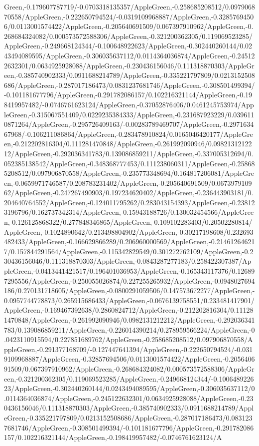 {\begin{tikzternal}
{Green,-0.179607787719/-0.0703318135357/AppleGreen,-0.258685208512/0.097906870558/AppleGreen,-0.222650794524/-0.0319109968887/AppleGreen,-0.32857694506/0.0113001574422/AppleGreen,-0.205640691509/0.067397910962/AppleGreen,-0.268684324082/0.000573572588306/AppleGreen,-0.321200362305/0.119069523285/AppleGreen,-0.249668124344/-0.100648922623/AppleGreen,-0.302440260144/0.0243494089595/AppleGreen,-0.306035637112/0.0114364036874/AppleGreen,-0.245122632301/0.0634925928088/AppleGreen,-0.230436156046/0.111318870303/AppleGreen,-0.385740902333/0.0911688214789/AppleGreen,-0.335221797809/0.0213152508686/AppleGreen,-0.287017186473/0.0831237681746/AppleGreen,-0.308501499394/-0.101181677796/AppleGreen,-0.291782086157/0.102216321144/AppleGreen,-0.198419957482/-0.0746761623124/AppleGreen,-0.37052876406/0.0461245753974/AppleGreen,-0.315067551409/0.0229235384333/AppleGreen,-0.231687923229/0.0396110871264/AppleGreen,-0.295726409163/-0.00283789469707/AppleGreen,-0.297163467968/-0.106211086864/AppleGreen,-0.283478910824/0.0165046420177/AppleGreen,-0.212202816304/0.111281470848/AppleGreen,-0.261992090946/0.0982131212212/AppleGreen,-0.292036341783/0.139086859211/AppleGreen,-0.337005312694/0.052385138542/AppleGreen,-0.348368777453/0.111238060311/AppleGreen,-0.258685208512/0.097906870558/AppleGreen,-0.235773348694/0.164817206081/AppleGreen,-0.0659971746587/0.208783231402/AppleGreen,-0.205640691509/0.067397910962/AppleGreen,-0.247267490903/0.197234620402/AppleGreen,-0.236443903181/0.204640764552/AppleGreen,-0.124011795262/0.283043154393/AppleGreen,-0.238123196796/0.162737342314/AppleGreen,-0.15943188726/0.130032454566/AppleGreen,-0.126125868322/0.277848346865/AppleGreen,-0.109102283403/0.20502280814/AppleGreen,-0.1024890642/0.213498804902/AppleGreen,-0.30217198608/0.232693482433/AppleGreen,-0.166629866289/0.206960000569/AppleGreen,-0.214612646217/0.157844291564/AppleGreen,-0.115342829549/0.301272762109/AppleGreen,-0.230436156046/0.111318870303/AppleGreen,-0.0843287277183/0.258422307387/AppleGreen,-0.0413441421517/0.196401036953/AppleGreen,-0.165343117376/0.126897295556/AppleGreen,-0.250055026874/0.227255265932/AppleGreen,-0.0948027694186/0.270131718605/AppleGreen,-0.0800291059506/0.147573672277/AppleGreen,-0.0957744778873/0.265915686433/AppleGreen,-0.0676139758551/0.233481417901/AppleGreen,-0.169467392638/0.2860824712/AppleGreen,-0.212202816304/0.111281470848/AppleGreen,-0.261992090946/0.0982131212212/AppleGreen,-0.292036341783/0.139086859211/AppleGreen,-0.226014390214/0.278959566224/AppleGreen,-0.0423110915594/0.227851689762/AppleGreen,-0.258685208512/0.097906870558/AppleGreen,-0.291377168709/-0.127447641394/AppleGreen,-0.222650794524/-0.0319109968887/AppleGreen,-0.32857694506/0.0113001574422/AppleGreen,-0.205640691509/0.067397910962/AppleGreen,-0.268684324082/0.000573572588306/AppleGreen,-0.321200362305/0.119069523285/AppleGreen,-0.249668124344/-0.100648922623/AppleGreen,-0.302440260144/0.0243494089595/AppleGreen,-0.306035637112/0.0114364036874/AppleGreen,-0.245122632301/0.0634925928088/AppleGreen,-0.230436156046/0.111318870303/AppleGreen,-0.385740902333/0.0911688214789/AppleGreen,-0.335221797809/0.0213152508686/AppleGreen,-0.287017186473/0.0831237681746/AppleGreen,-0.308501499394/-0.101181677796/AppleGreen,-0.291782086157/0.102216321144/AppleGreen,-0.198419957482/-0.0746761623124/A}
\end{tikzternal}}
